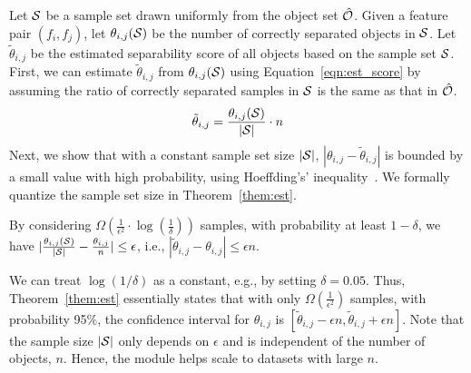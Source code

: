 Let ${\mathcal{S}}$ be a sample set drawn uniformly from the object set $\hat{{\mathcal{O}}}$. Given a feature pair $(f_i,f_j)$, let $\theta_{i,j}({\mathcal{S}})$ be the number of correctly separated objects in ${\mathcal{S}}$. Let $\tilde{\theta}_{i,j}$ be the estimated separability score of all objects based on the sample set ${\mathcal{S}}$. First, we can estimate $\tilde{\theta}_{i,j}$ from $\theta_{i,j}({\mathcal{S}})$ using Equation~\ref{eqn:est_score} by assuming the ratio of correctly separated samples in ${\mathcal{S}}$ is the same as that in $\hat{{\mathcal{O}}}$.
\begin{equation}\label{eqn:est_score}
\tilde{\theta}_{i,j} = \frac{\theta_{i,j}({\mathcal{S}})}{|{\mathcal{S}}|} \cdot n
\end{equation}
\noindent Next, we show that with a constant sample set size $|{\mathcal{S}}|$, $|\theta_{i,j}-\tilde{\theta}_{i,j}|$ is bounded by a small value with high probability, using Hoeffding's' inequality~\cite{hoeffding1963probability}. We formally quantize the sample set size in Theorem~\ref{them:est}.

\begin{theorem}\label{them:est}
By considering $\Omega(\frac{1}{\epsilon^2}\cdot \log(\frac{1}{\delta}))$ samples, with probability at least $1-\delta$, we have $|\frac{\theta_{i,j}({\mathcal{S}})}{|{\mathcal{S}}|}-\frac{\theta_{i,j}}{n}| \leq \epsilon$, i.e., $|\tilde{\theta}_{i,j}-\theta_{i,j}|\leq \epsilon n$.
\end{theorem}
\noindent We can treat $\log(1/\delta)$ as a constant, e.g., by setting $\delta = 0.05$. Thus, Theorem~\ref{them:est} essentially states that with only $\Omega(\frac{1}{\epsilon^2})$ samples, with probability 95\%, the confidence interval for $\theta_{i,j}$ is $[\tilde{\theta}_{i,j}-\epsilon n, \tilde{\theta}_{i,j}+\epsilon n]$. Note that the sample size $|{\mathcal{S}}|$ only depends on $\epsilon$ and is independent of the number of objects, $n$. Hence, the \sampling module helps \genviz scale to datasets with large $n$.

